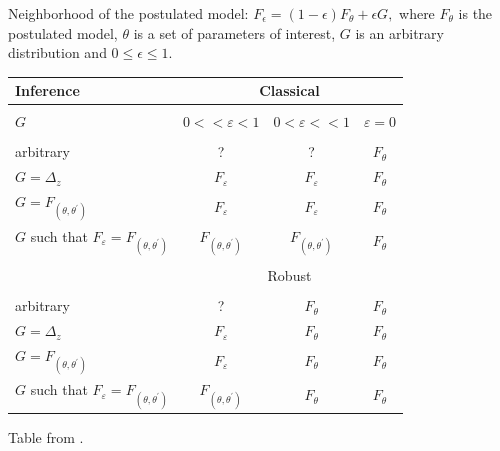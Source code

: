 \documentclass{beamer}
\begin{document}
\begin{frame}
\frametitle{}
{\color{blue}Neighborhood of the postulated model}:
$F_{\epsilon} = (1-\epsilon) F_{\theta} + \epsilon G,$
where $F_{\theta}$ is the postulated model, $\theta$ is a set of parameters of
interest, $G$ is an arbitrary distribution and $0\leq \epsilon \leq 1$.

\begin{table}[h]
{\scriptsize\begin{tabular}{lccc}
 Inference & \multicolumn{3}{c}{Classical} \\ \hline\\
 $G$ &
$0<<\varepsilon <1$ & $0<\varepsilon <<1$ & $\varepsilon =0$ \\
\hline \\
arbitrary & ? & ? & $F_{\theta }$ \\
$G=\Delta _{z}$ & $F_{\varepsilon }$ & $F_{\varepsilon }$ & $F_{\theta }$ \\
$G=F_{(\theta ,\theta ^{\prime })}$ & $F_{\varepsilon }$ &
$F_{\varepsilon }$
& $F_{\theta }$ \\
$G$ such that $F_{\varepsilon }=F_{(\theta ,\theta ^{\prime })}$ & $%
F_{(\theta ,\theta ^{\prime })}$ & $F_{(\theta ,\theta ^{\prime })}$ & $%
F_{\theta }$ \\ \hline\\
 & \multicolumn{3}{c}{Robust} \\ 
\hline \\
arbitrary & ? & $F_{\theta }$ & $F_{\theta }$ \\
$G=\Delta _{z}$ & $F_{\varepsilon }$ & $F_{\theta }$ & $F_{\theta }$ \\
$G=F_{(\theta ,\theta ^{\prime })}$ & $F_{\varepsilon }$ & $F_{\theta }$ & $%
F_{\theta }$ \\
$G$ such that $F_{\varepsilon }=F_{(\theta ,\theta ^{\prime })}$ & $%
F_{(\theta ,\theta ^{\prime })}$ & $F_{\theta }$ & $F_{\theta }$ \\
\hline
\end{tabular}}
\end{table}

Table from .
\end{frame}
\end{document}
